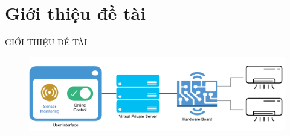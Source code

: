\section{Giới thiệu đề tài}
\begin{frame}{GIỚI THIỆU ĐỀ TÀI}
	\begin{figure}[htbp]
		\centering
		\includegraphics[scale=.6]{pic/Presentation-Page-7-BTS-Model.pdf}
	\end{figure}
\end{frame}